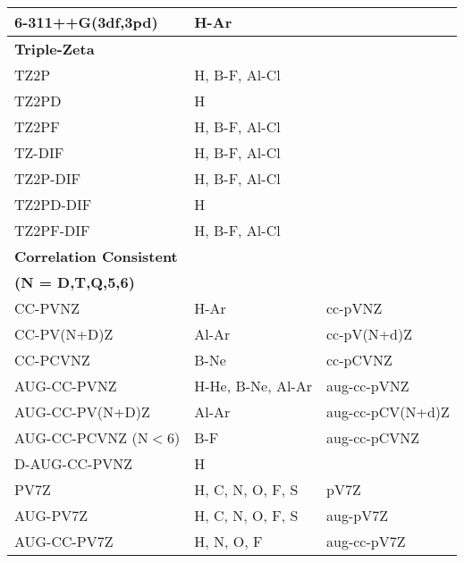 \begin{table}[tbp]
\begin{center}
\begin{tabular}{|l|l|l|}
        6-311++G(3df,3pd)       & H-Ar                  &\\
\hline
\hline
\textbf{Triple-Zeta} 			&				&\\	
\hline
	TZ2P			& H, B-F, Al-Cl		&\\
	TZ2PD			& H				&\\
	TZ2PF			& H, B-F, Al-Cl		&\\
	TZ-DIF			& H, B-F, Al-Cl		&\\ 	
	TZ2P-DIF		& H, B-F, Al-Cl		&\\
	TZ2PD-DIF		& H				&\\
	TZ2PF-DIF		& H, B-F, Al-Cl		&\\		
\hline
\hline
\textbf{Correlation Consistent}		&			&\\
\textbf{ (N = D,T,Q,5,6)}	&			&	\\
\hline
	CC-PVNZ			& H-Ar			&cc-pVNZ\\
	CC-PV(N+D)Z		& Al-Ar			&cc-pV(N+d)Z\\
        CC-PCVNZ                & B-Ne                  &cc-pCVNZ\\
	AUG-CC-PVNZ		& H-He, B-Ne, Al-Ar	&aug-cc-pVNZ\\
	AUG-CC-PV(N+D)Z		& Al-Ar			&aug-cc-pCV(N+d)Z\\
	AUG-CC-PCVNZ (N${<}$6)	& B-F			&aug-cc-pCVNZ\\
	D-AUG-CC-PVNZ		& H			&\\
	PV7Z			& H, C, N, O, F, S	&pV7Z\\
	AUG-PV7Z		& H, C, N, O, F, S	&aug-pV7Z\\
	AUG-CC-PV7Z             & H, N, O, F            &aug-cc-pV7Z\\
\hline
\hline
\hline
\end{tabular}
\end{center}
\end{table}

